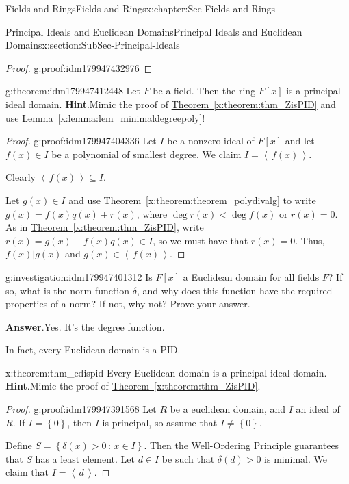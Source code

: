 \documentclass[oneside,10pt,]{book}
\newcommand{\blocktitlefont}{\relax}
\newcommand{\xreffont}{\relax}
\numberwithin{equation}{section}
\newcommand{\ideal}[1]{\left\langle\, #1 \,\right\rangle}
\newcommand{\set}[1]{\left\{ {#1} \right\}}
\newcommand{\setof}[2]{{\left\{#1\,\colon\,#2\right\}}}
\newcommand{\lt}{<}
\begin{document}
\begin{chapterptx}{Fields and Rings}{}{Fields and Rings}{}{}{x:chapter:Sec-Fields-and-Rings}
\begin{sectionptx}{Principal Ideals and Euclidean Domains}{}{Principal Ideals and Euclidean Domains}{}{}{x:section:SubSec-Principal-Ideals}
\begin{proof}{}{g:proof:idm179947432976}
\end{proof}
\begin{theorem}{}{}{g:theorem:idm179947412448}%
Let \(F\) be a field. Then the ring \(F[x]\) is a principal ideal domain.%
\textbf{\blocktitlefont Hint}.\quad{}Mimic the proof of \hyperref[x:theorem:thm_ZisPID]{Theorem~{\xreffont\ref{x:theorem:thm_ZisPID}}} and use \hyperref[x:lemma:lem_minimaldegreepoly]{Lemma~{\xreffont\ref{x:lemma:lem_minimaldegreepoly}}}!%
\end{theorem}
\begin{proof}{}{g:proof:idm179947404336}
Let \(I\) be a nonzero ideal of \(F[x]\) and let \(f(x)\in I\) be a polynomial of smallest degree. We claim \(I = \ideal{f(x)}\).%
\par
Clearly \(\ideal{f(x)}\subseteq I\).%
\par
Let \(g(x)\in I\) and use \hyperref[x:theorem:theorem_polydivalg]{Theorem~{\xreffont\ref{x:theorem:theorem_polydivalg}}} to write \(g(x) = f(x) q(x) + r(x)\), where \(\deg r(x) \lt \deg f(x)\) or \(r(x) = 0\). As in \hyperref[x:theorem:thm_ZisPID]{Theorem~{\xreffont\ref{x:theorem:thm_ZisPID}}}, write \(r(x) = g(x) - f(x) q(x) \in I\), so we must have that \(r(x) = 0\). Thus, \(f(x) | g(x)\) and \(g(x)\in \ideal{f(x)}\).%
\end{proof}
\begin{investigation}{}{g:investigation:idm179947401312}%
Is \(F[x]\) a Euclidean domain for all fields \(F\)? If so, what is the norm function \(\delta\), and why does this function have the required properties of a norm? If not, why not? Prove your answer.%
\par\smallskip%
\noindent\textbf{\blocktitlefont Answer}.\hypertarget{g:answer:idm179947394352}{}\quad{}Yes. It's the degree function.%
\end{investigation}
In fact, every Euclidean domain is a PID.%
\begin{theorem}{}{}{x:theorem:thm_edispid}%
Every Euclidean domain is a principal ideal domain.%
\textbf{\blocktitlefont Hint}.\quad{}Mimic the proof of \hyperref[x:theorem:thm_ZisPID]{Theorem~{\xreffont\ref{x:theorem:thm_ZisPID}}}.%
\end{theorem}
\begin{proof}{}{g:proof:idm179947391568}
Let \(R\) be a euclidean domain, and \(I\) an ideal of \(R\). If \(I = \set{0}\), then \(I\) is principal, so assume that \(I\ne \set{0}\).%
\par
Define \(S = \setof{\delta(x)>0}{x\in I}\). Then the Well-Ordering Principle guarantees that \(S\) has a least element. Let \(d\in I\) be such that \(\delta(d) > 0\) is minimal. We claim that \(I = \ideal{d}\).%

\end{proof}
\end{sectionptx}
\end{chapterptx}
\end{document}
